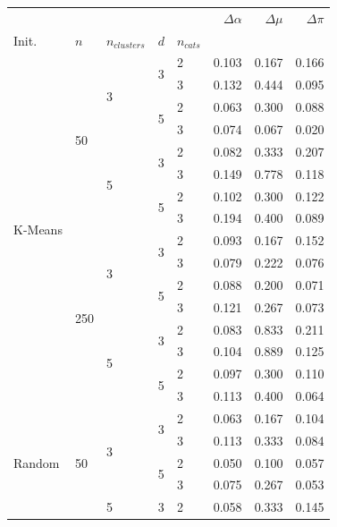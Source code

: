 \begin{table}[H]
\begin{minipage}{.48\columnwidth}
\begin{adjustbox}{width=\columnwidth}
\begin{tabular}{lllllrrr}
\toprule
 &  &  &  &  & $\Delta \alpha$ & $\Delta \mu$ & $\Delta \pi$ \\
Init. & $n$ & $n_{clusters}$ & $d$ & $n_{cats}$ &  &  &  \\
\midrule
\multirow[t]{16}{*}{K-Means} & \multirow[t]{8}{*}{50} & \multirow[t]{4}{*}{3} & \multirow[t]{2}{*}{3} & 2 & 0.103 & 0.167 & 0.166 \\
 &  &  &  & 3 & 0.132 & 0.444 & 0.095 \\
\cline{4-8}
 &  &  & \multirow[t]{2}{*}{5} & 2 & 0.063 & 0.300 & 0.088 \\
 &  &  &  & 3 & 0.074 & 0.067 & 0.020 \\
\cline{3-8} \cline{4-8}
 &  & \multirow[t]{4}{*}{5} & \multirow[t]{2}{*}{3} & 2 & 0.082 & 0.333 & 0.207 \\
 &  &  &  & 3 & 0.149 & 0.778 & 0.118 \\
\cline{4-8}
 &  &  & \multirow[t]{2}{*}{5} & 2 & 0.102 & 0.300 & 0.122 \\
 &  &  &  & 3 & 0.194 & 0.400 & 0.089 \\
\cline{2-8} \cline{3-8} \cline{4-8}
 & \multirow[t]{8}{*}{250} & \multirow[t]{4}{*}{3} & \multirow[t]{2}{*}{3} & 2 & 0.093 & 0.167 & 0.152 \\
 &  &  &  & 3 & 0.079 & 0.222 & 0.076 \\
\cline{4-8}
 &  &  & \multirow[t]{2}{*}{5} & 2 & 0.088 & 0.200 & 0.071 \\
 &  &  &  & 3 & 0.121 & 0.267 & 0.073 \\
\cline{3-8} \cline{4-8}
 &  & \multirow[t]{4}{*}{5} & \multirow[t]{2}{*}{3} & 2 & 0.083 & 0.833 & 0.211 \\
 &  &  &  & 3 & 0.104 & 0.889 & 0.125 \\
\cline{4-8}
 &  &  & \multirow[t]{2}{*}{5} & 2 & 0.097 & 0.300 & 0.110 \\
 &  &  &  & 3 & 0.113 & 0.400 & 0.064 \\
\cline{1-8} \cline{2-8} \cline{3-8} \cline{4-8}
\multirow[t]{16}{*}{Random} & \multirow[t]{8}{*}{50} & \multirow[t]{4}{*}{3} & \multirow[t]{2}{*}{3} & 2 & 0.063 & 0.167 & 0.104 \\
 &  &  &  & 3 & 0.113 & 0.333 & 0.084 \\
\cline{4-8}
 &  &  & \multirow[t]{2}{*}{5} & 2 & 0.050 & 0.100 & 0.057 \\
 &  &  &  & 3 & 0.075 & 0.267 & 0.053 \\
\cline{3-8} \cline{4-8}
 &  & \multirow[t]{4}{*}{5} & \multirow[t]{2}{*}{3} & 2 & 0.058 & 0.333 & 0.145 \\

\end{tabular}
\end{adjustbox}
\end{minipage}
\end{table}
